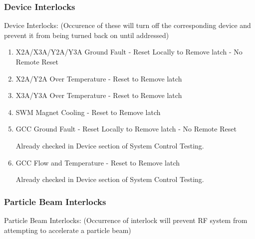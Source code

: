 \documentclass[11pt]{book}		%
\begin{document}
\subsubsection{Device Interlocks}

Device Interlocks:
(Occurence of these will turn off the corresponding device and prevent it from being turned back on until addressed)

\begin{enumerate}
 \item X2A/X3A/Y2A/Y3A Ground Fault - Reset Locally to Remove latch - No Remote Reset
 \item X2A/Y2A Over Temperature - Reset to Remove latch
 \item X3A/Y3A Over Temperature - Reset to Remove latch
 \item SWM Magnet Cooling - Reset to Remove latch
 \item GCC Ground Fault - Reset Locally to Remove latch - No Remote Reset

\color{red}
Already checked in Device section of System Control Testing.
\color{black}

 \item GCC Flow and Temperature - Reset to Remove latch

\color{red}
Already checked in Device section of System Control Testing.
\color{black}

\end{enumerate}

\subsubsection{Particle Beam Interlocks}

Particle Beam Interlocks:
(Occurrence of interlock will prevent RF system from attempting to accelerate a particle beam)
\end{document}
